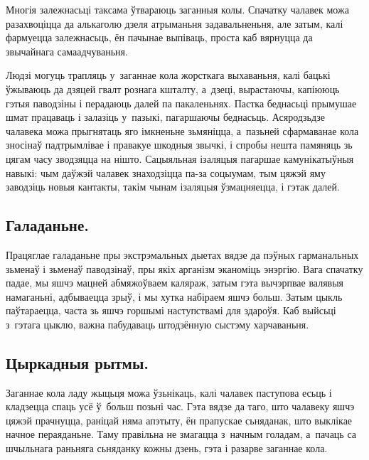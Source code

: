 Многія залежнасьці таксама ўтвараюць заганныя колы. Спачатку чалавек можа разахвоціцца да алькаголю дзеля атрыманьня задавальненьня, але затым, калі фармуецца залежнасьць, ён пачынае выпіваць, проста каб вярнуцца да звычайнага самаадчуваньня. 


Людзі могуць трапляць у~заганнае кола жорсткага выхаваньня, калі бацькі ўжываюць да дзяцей гвалт рознага кшталту, а~дзеці, вырастаючы, капіююць гэтыя паводзіны і перадаюць далей па пакаленьнях. Пастка беднасьці прымушае шмат працаваць і залазіць у~пазыкі, пагаршаючы беднасьць. Асяродзьдзе чалавека можа прыгнятаць яго імкненьне зьмяніцца, а~пазьней сфармаванае кола зносінаў падтрымлівае і правакуе шкодныя звычкі, і спробы нешта памяняць зь цягам часу зводзяцца на нішто. Сацыяльная ізаляцыя пагаршае камунікатыўныя навыкі: чым даўжэй чалавек знаходзіцца па-за соцыумам, тым цяжэй яму заводзіць новыя кантакты, такім чынам ізаляцыя ўзмацняецца, і гэтак далей.

\subsection*{Галаданьне.}

Працяглае галаданьне пры экстрэмальных дыетах вядзе да пэўных гарманальных зьменаў і зьменаў паводзінаў, пры якіх арганізм эканоміць энэргію. Вага спачатку падае, мы яшчэ мацней абмяжоўваем каляраж, затым гэта вычэрпвае валявыя намаганьні, адбываецца зрыў, і мы хутка набіраем яшчэ больш. Затым цыкль паўтараецца, часта зь яшчэ горшымі наступствамі для здароўя. Каб выйсьці з~гэтага цыклю, важна пабудаваць штодзённую сыстэму харчаваньня.

\subsection*{Цыркадныя рытмы.}

Заганнае кола ладу жыцьця можа ўзьнікаць, калі чалавек паступова есьць і кладзецца спаць усё ў~больш позьні час. Гэта вядзе да таго, што чалавеку яшчэ цяжэй прачнуцца, раніцай няма апэтыту, ён прапускае сьняданак, што выклікае начное пераяданьне. Таму правільна не змагацца з~начным голадам, а~пачаць са шчыльнага раньняга сьняданку кожны дзень, гэта і разарве заганнае кола.

